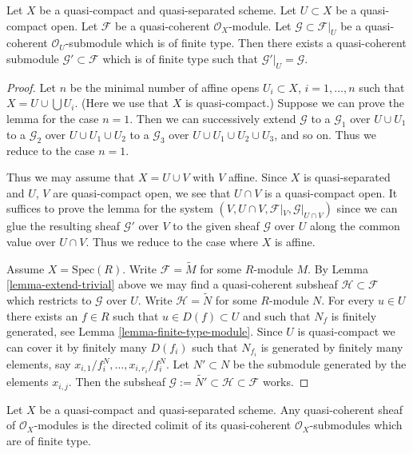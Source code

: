 \begin{lemma}
\label{lemma-extend}
Let $X$ be a quasi-compact and quasi-separated scheme.
Let $U \subset X$ be a quasi-compact open.
Let $\mathcal{F}$ be a quasi-coherent $\mathcal{O}_X$-module.
Let $\mathcal{G} \subset \mathcal{F}|_U$ be a quasi-coherent
$\mathcal{O}_U$-submodule which is of finite type. Then
there exists a quasi-coherent submodule $\mathcal{G}' \subset \mathcal{F}$
which is of finite type such that $\mathcal{G}'|_U = \mathcal{G}$.
\end{lemma}

\begin{proof}
Let $n$ be the minimal number of affine opens $U_i \subset X$,
$i = 1, \ldots , n$ such that $X = U \cup \bigcup U_i$.
(Here we use that $X$ is quasi-compact.) Suppose
we can prove the lemma for the case $n = 1$. Then we can successively
extend $\mathcal{G}$
to a $\mathcal{G}_1$ over $U \cup U_1$
to a $\mathcal{G}_2$ over $U \cup U_1 \cup U_2$
to a $\mathcal{G}_3$ over $U \cup U_1 \cup U_2 \cup U_3$,
and so on.
Thus we reduce to the case $n = 1$.

\medskip\noindent
Thus we may assume that $X = U \cup V$ with $V$ affine.
Since $X$ is quasi-separated and $U$, $V$ are quasi-compact open,
we see that $U \cap V$ is a quasi-compact open. It suffices to prove the
lemma for the system $(V, U \cap V, \mathcal{F}|_V, \mathcal{G}|_{U \cap V})$
since we can glue the resulting sheaf $\mathcal{G}'$ over $V$
to the given sheaf $\mathcal{G}$ over $U$ along the common value
over $U \cap V$.
Thus we reduce to the case where $X$ is affine.

\medskip\noindent
Assume $X = \text{Spec}(R)$. Write $\mathcal{F} = \widetilde M$
for some $R$-module $M$. By Lemma \ref{lemma-extend-trivial} above we may
find a quasi-coherent subsheaf $\mathcal{H} \subset \mathcal{F}$
which restricts to $\mathcal{G}$ over $U$.
Write $\mathcal{H} = \widetilde N$ for some $R$-module $N$.
For every $u \in U$ there exists an $f \in R$ such that
$u \in D(f) \subset U$ and such that $N_f$ is finitely generated,
see Lemma \ref{lemma-finite-type-module}.
Since $U$ is quasi-compact we can cover it by finitely
many $D(f_i)$ such that $N_{f_i}$ is generated by
finitely many elements, say $x_{i, 1}/f_i^N, \ldots, x_{i, r_i}/f_i^N$.
Let $N' \subset N$ be the submodule generated by the elements
$x_{i, j}$. Then the subsheaf
$\mathcal{G} := \widetilde{N'} \subset \mathcal{H} \subset \mathcal{F}$
works.
\end{proof}

\begin{lemma}
\label{lemma-quasi-coherent-colimit-finite-type}
Let $X$ be a quasi-compact and quasi-separated scheme.
Any quasi-coherent sheaf of $\mathcal{O}_X$-modules
is the directed colimit of its quasi-coherent
$\mathcal{O}_X$-submodules which are of finite type.
\end{lemma}

